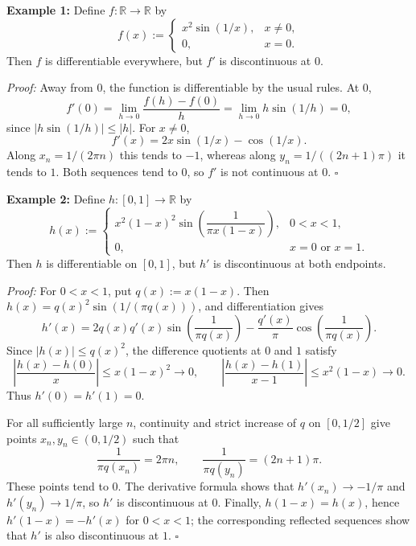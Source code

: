 \documentclass[a4paper,11pt,abstracton]{scrartcl}
\newcommand{\RR}{\mathbb{R}}
\theoremstyle{dotlessP}
\theoremstyle{dotlessS}
\theoremstyle{remark}
\theoremstyle{definition}
\begin{document}
\begin{problem_box}
\textbf{Example 1:} Define $f:\RR\to\RR$ by
\[
    f(x):=\begin{cases}
        x^2\sin(1/x),&x\ne0,\\
        0,&x=0.
    \end{cases}
\]
Then $f$ is differentiable everywhere, but $f'$ is discontinuous at
$0$.
\end{problem_box}

\begin{claim_box}
\textit{Proof:} Away from $0$, the function is differentiable by the
usual rules. At $0$,
\[
    f'(0)=\lim_{h\to0}\frac{f(h)-f(0)}h
    =\lim_{h\to0}h\sin(1/h)=0,
\]
since $|h\sin(1/h)|\le|h|$. For $x\ne0$,
\[
    f'(x)=2x\sin(1/x)-\cos(1/x).
\]
Along $x_n=1/(2\pi n)$ this tends to $-1$, whereas along
$y_n=1/((2n+1)\pi)$ it tends to $1$. Both sequences tend to $0$, so
$f'$ is not continuous at $0$.
\hfill$\square$
\end{claim_box}

\begin{problem_box}
\textbf{Example 2:} Define $h:[0,1]\to\RR$ by
\[
    h(x):=\begin{cases}
        x^2(1-x)^2\sin\!\left(\dfrac{1}{\pi x(1-x)}\right),&0<x<1,\\
        0,&x=0\text{ or }x=1.
    \end{cases}
\]
Then $h$ is differentiable on $[0,1]$, but $h'$ is discontinuous at
both endpoints.
\end{problem_box}

\begin{claim_box}
\textit{Proof:} For $0<x<1$, put $q(x):=x(1-x)$. Then
$h(x)=q(x)^2\sin(1/(\pi q(x)))$, and differentiation gives
\[
    h'(x)=2q(x)q'(x)\sin\!\left(\frac{1}{\pi q(x)}\right)
    -\frac{q'(x)}{\pi}\cos\!\left(\frac{1}{\pi q(x)}\right).
\]
Since $|h(x)|\le q(x)^2$, the difference quotients at $0$ and $1$
satisfy
\[
    \left|\frac{h(x)-h(0)}x\right|\le x(1-x)^2\longrightarrow0,
    \qquad
    \left|\frac{h(x)-h(1)}{x-1}\right|
    \le x^2(1-x)\longrightarrow0.
\]
Thus $h'(0)=h'(1)=0$.

For all sufficiently large $n$, continuity and strict increase of
$q$ on $[0,1/2]$ give points $x_n,y_n\in(0,1/2)$ such that
\[
    \frac{1}{\pi q(x_n)}=2\pi n,
    \qquad
    \frac{1}{\pi q(y_n)}=(2n+1)\pi.
\]
These points tend to $0$. The derivative formula shows that
$h'(x_n)\to-1/\pi$ and $h'(y_n)\to1/\pi$, so $h'$ is
discontinuous at $0$. Finally, $h(1-x)=h(x)$, hence
$h'(1-x)=-h'(x)$ for $0<x<1$; the corresponding reflected sequences
show that $h'$ is also discontinuous at $1$.
\hfill$\square$
\end{claim_box}
\end{document}
